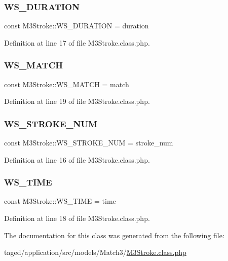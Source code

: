 \subsubsection{\texorpdfstring{W\+S\+\_\+\+D\+U\+R\+A\+T\+I\+ON}{WS\_DURATION}}
{\footnotesize\ttfamily const M3\+Stroke\+::\+W\+S\+\_\+\+D\+U\+R\+A\+T\+I\+ON = \textquotesingle{}duration\textquotesingle{}}



Definition at line 17 of file M3\+Stroke.\+class.\+php.

\mbox{\label{class_m3_stroke_ab61b95e4c61ad8aa6e729a69b20b4010}} 
\subsubsection{\texorpdfstring{W\+S\+\_\+\+M\+A\+T\+CH}{WS\_MATCH}}
{\footnotesize\ttfamily const M3\+Stroke\+::\+W\+S\+\_\+\+M\+A\+T\+CH = \textquotesingle{}match\textquotesingle{}}



Definition at line 19 of file M3\+Stroke.\+class.\+php.

\mbox{\label{class_m3_stroke_ac14351eb2eee8d5cf56f45b514731563}} 
\subsubsection{\texorpdfstring{W\+S\+\_\+\+S\+T\+R\+O\+K\+E\+\_\+\+N\+UM}{WS\_STROKE\_NUM}}
{\footnotesize\ttfamily const M3\+Stroke\+::\+W\+S\+\_\+\+S\+T\+R\+O\+K\+E\+\_\+\+N\+UM = \textquotesingle{}stroke\+\_\+num\textquotesingle{}}



Definition at line 16 of file M3\+Stroke.\+class.\+php.

\mbox{\label{class_m3_stroke_aca12eac4d24e485adec1e746a84f94a1}} 
\subsubsection{\texorpdfstring{W\+S\+\_\+\+T\+I\+ME}{WS\_TIME}}
{\footnotesize\ttfamily const M3\+Stroke\+::\+W\+S\+\_\+\+T\+I\+ME = \textquotesingle{}time\textquotesingle{}}



Definition at line 18 of file M3\+Stroke.\+class.\+php.



The documentation for this class was generated from the following file\+:\begin{DoxyCompactItemize}
\item 
taged/application/src/models/\+Match3/\hyperlink{_m3_stroke_8class_8php}{M3\+Stroke.\+class.\+php}\end{DoxyCompactItemize}
